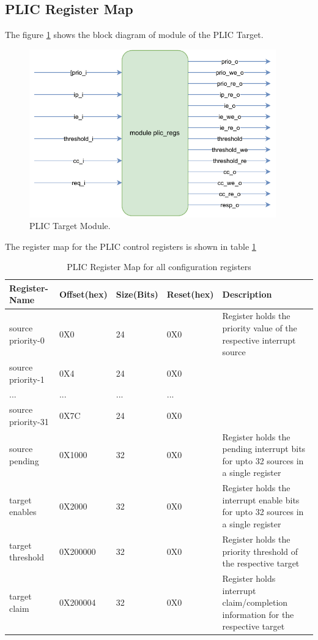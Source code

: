 \subsection{PLIC Register Map}
The figure \ref{fig:plic_RegMap} shows the block diagram of module of the PLIC Target.\\

\begin{figure}[h!]
  \centering
  \includegraphics[width=0.95\textwidth]{./fatima_figures/regmap.drawio.pdf}
  \caption{PLIC Target Module.}
  \label{fig:plic_RegMap}
\end{figure}

The register map for the PLIC control registers is shown in table \ref{table:regmap}

\begin{table}[h!]
\centering
 \begin{tabular}{||p{3cm} p{1.5cm} p{1.5cm} p{1.5cm} p{5cm}||} 
 \hline
 \rowcolor{gray}
 Register-Name & Offset(hex) & Size(Bits) & Reset(hex) & Description  \\ [0.5ex] 
 \hline\hline
 \rowcolor{lightgray}
 source priority-0 & 0X0 & 24 & 0X0 & Register holds the priority value of the respective interrupt source\\ 
 \rowcolor{gray}
 source priority-1 & 0X4 & 24 & 0X0 & \\ 
 \rowcolor{lightgray}
 ... & ... & ... & ... & \\
 \rowcolor{gray}
 source priority-31 & 0X7C & 24 & 0X0 & \\ 
 \rowcolor{lightgray}
 source pending & 0X1000 & 32 & 0X0 & Register holds the pending interrupt bits for upto 32 sources in a single register\\
 \rowcolor{gray}
 target enables & 0X2000 & 32 & 0X0 & Register holds the interrupt enable bits for upto 32 sources in a single register\\
 \rowcolor{lightgray}
 target threshold & 0X200000 & 32 & 0X0 & Register holds the priority threshold of the respective target\\
 \rowcolor{gray}
 target claim & 0X200004 & 32 & 0X0 & Register holds interrupt claim/completion information for the respective target\\ [1ex] 
 \hline
 \end{tabular}
 \caption{PLIC Register Map for all configuration registers}
 \label{table:regmap}
\end{table}

